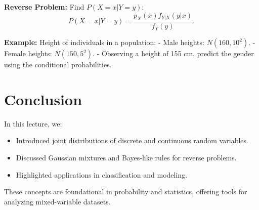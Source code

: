 \documentclass{article}
\begin{document}
\textbf{Reverse Problem:}
Find $P(X=x|Y=y)$:
\[
  P(X=x|Y=y) = \frac{p_X(x)f_{Y|X}(y|x)}{f_Y(y)}.
\]

\textbf{Example:}
Height of individuals in a population:
- Male heights: $N(160, 10^2)$.
- Female heights: $N(150, 5^2)$.
- Observing a height of 155 cm, predict the gender using the conditional probabilities.

\section*{Conclusion}

In this lecture, we:
\begin{itemize}
  \item Introduced joint distributions of discrete and continuous random variables.
  \item Discussed Gaussian mixtures and Bayes-like rules for reverse problems.
  \item Highlighted applications in classification and modeling.
\end{itemize}

These concepts are foundational in probability and statistics, offering tools for analyzing mixed-variable datasets.
\end{document}
